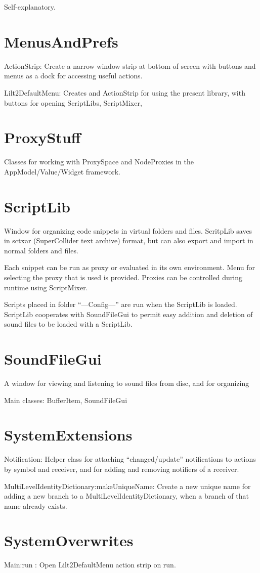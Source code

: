 \documentclass[11pt, a4paper]{scrartcl}
\begin{document}
Self-explanatory. 
\section{MenusAndPrefs}
\label{sec-5}


ActionStrip: Create a narrow window strip at bottom of screen with buttons and menus as a dock for accessing useful actions. 

Lilt2DefaultMenu: Creates and ActionStrip for using the present library, with buttons for opening ScriptLibs, ScriptMixer, 
\section{ProxyStuff}
\label{sec-6}


Classes for working with ProxySpace and NodeProxies in the AppModel/Value/Widget framework.
\section{ScriptLib}
\label{sec-7}


Window for organizing code snippets in virtual folders and files. ScritpLib saves in sctxar (SuperCollider text archive) format, but can also export and import in normal folders and files. 

Each snippet can be run as proxy or evaluated in its own environment. Menu for selecting the proxy that is used is provided. Proxies can be controlled during runtime using ScriptMixer. 

Scripts placed in folder ``---Config---'' are run when the ScriptLib is loaded.  ScriptLib cooperates with SoundFileGui to permit easy addition and deletion of sound files to be loaded with a ScriptLib. 
\section{SoundFileGui}
\label{sec-8}


A window for viewing and listening to sound files from disc, and for organizing 

Main classes: BufferItem, SoundFileGui
\section{SystemExtensions}
\label{sec-9}


Notification: Helper class for attaching ``changed/update'' notifications to actions by symbol and receiver, and for adding and removing notifiers of a receiver. 

MultiLevelIdentityDictionary:makeUniqueName: Create a new unique name for adding a new branch to a MultiLevelIdentityDictionary, when a branch of that name already exists. 
\section{SystemOverwrites}
\label{sec-10}


Main:run : Open Lilt2DefaultMenu action strip on run. 
\end{document}
